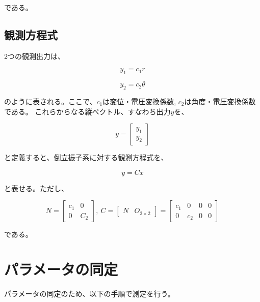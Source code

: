 \documentclass[a4j,11pt,twoside]{jbook}
\begin{document}
である。

\subsection{観測方程式}
2つの観測出力は、

$$
    y_{1} = c_{1} r
$$

$$
    y_{2} = c_{2} \theta
$$

のように表される。ここで、$c_{1}$は変位・電圧変換係数, $c_{2}$は角度・電圧変換係数である。
これらからなる縦ベクトル、すなわち出力$y$を、

$$
    y = 
    \left[
        \begin{array}{c}
            y_{1} \\
            y_{2}
        \end{array}    
    \right]
$$

と定義すると、倒立振子系に対する観測方程式を、

\begin{equation}
    y = Cx
\end{equation}

と表せる。ただし、

$$
    N = 
    \left[
        \begin{array}{cc}
            c_{1}  &  0 \\
            0      &  C_{2}
        \end{array}
    \right],\
    C = 
    \left[
        \begin{array}{cc}
            N  &  O_{2 \times 2}
        \end{array}
    \right]
    =
    \left[
        \begin{array}{cccc}
            c_{1}  &    0    &    0    &    0 \\
            0      &  c_{2}  &    0    &    0
        \end{array}
    \right]
$$

である。

\section{パラメータの同定}
パラメータの同定のため、以下の手順で測定を行う。
\end{document}
